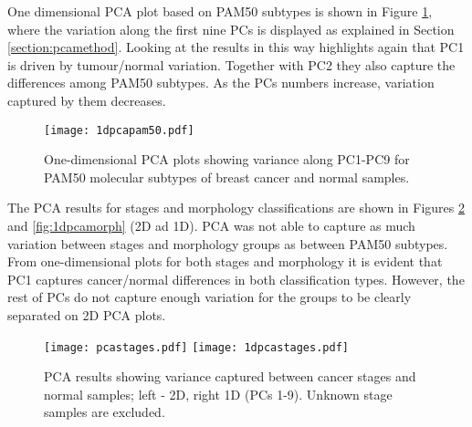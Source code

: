    \newpage
    One dimensional PCA plot based on PAM50 subtypes is shown in Figure \ref{fig:1dpcapam50}, where the variation along the first nine PCs is displayed as explained in Section \ref{section:pcamethod}. Looking at the results in this way highlights again that PC1 is driven by tumour/normal variation. Together with PC2 they also capture the differences among PAM50 subtypes. As the PCs numbers increase, variation captured by them decreases. 
    
            \begin{figure}[!h]
            \centering
            \texttt{[image: 1dpcapam50.pdf]}
            \caption[PCA plot showing separation by PAM50 subtypes (1D)]{One-dimensional PCA plots showing variance along PC1-PC9 for PAM50 molecular subtypes of breast cancer and normal samples. }
            \label{fig:1dpcapam50}
            \end{figure}
    
    
    The PCA results for stages and morphology classifications are shown in Figures \ref{fig:1dpcastage} and \ref{fig:1dpcamorph} (2D ad 1D). PCA was not able to capture as much variation between stages and morphology groups as between PAM50 subtypes. From one-dimensional plots for both stages and morphology it is evident that PC1 captures cancer/normal differences in both classification types. However, the rest of PCs do not capture enough variation for the groups to be clearly separated on 2D PCA plots. 
    
            
            \begin{figure}[!h]
            \hspace*{\fill}
            \texttt{[image: pcastages.pdf]}\hfill
            \texttt{[image: 1dpcastages.pdf]}
            \hspace*{\fill}
            \caption[PCA plots (2D and 1D) showing separation by cancer stages]{PCA results showing variance captured between cancer stages and normal samples; left - 2D, right 1D (PCs 1-9). Unknown stage samples are excluded.}
            \label{fig:1dpcastage}
            \end{figure}
            
